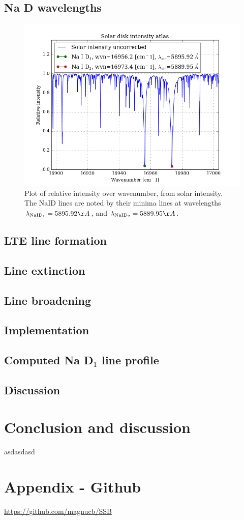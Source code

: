 \documentclass[11pt,a4paper,notitlepage]{article}
\begin{document}
\subsection{Na D wavelengths}
\begin{figure}[H]
\center
	\includegraphics[scale=0.42]{../figs/3vac_wvl_min.png}
	\caption{Plot of relative intensity over wavenumber, from solar intensity.\\
	The NaID lines are noted  by their minima lines at wavelengths $\lambda_{\text{NaID}_1} = 5895.92 \AA$, and $\lambda_{\text{NaID}_2} = 5889.95 \AA$.}
\end{figure}


\subsection{LTE line formation}

\subsection{Line extinction}

\subsection{Line broadening}

\subsection{Implementation}

\subsection{Computed Na D$_1$ line profile}

\subsection{Discussion}



\section*{Conclusion and discussion}
asdasdasd

\section*{Appendix - Github} \label{section:github}
\url{https://github.com/magnucb/SSB}
\end{document}
